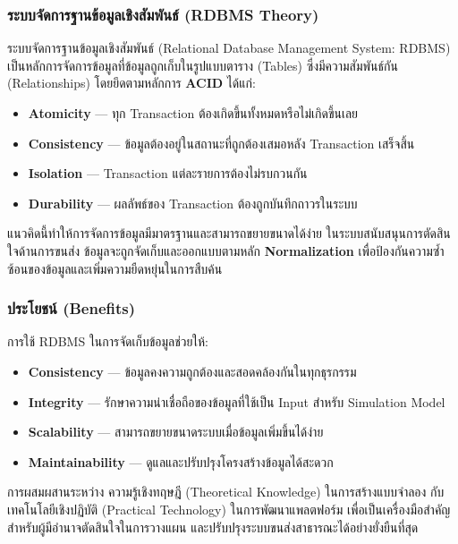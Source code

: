 \subsubsection{ระบบจัดการฐานข้อมูลเชิงสัมพันธ์ (RDBMS Theory)}
\begin{mypara}
    \indent ระบบจัดการฐานข้อมูลเชิงสัมพันธ์ (Relational Database Management System: RDBMS) 
    เป็นหลักการจัดการข้อมูลที่ข้อมูลถูกเก็บในรูปแบบตาราง (Tables) 
    ซึ่งมีความสัมพันธ์กัน (Relationships) โดยยึดตามหลักการ \textbf{ACID} ได้แก่:
\end{mypara}
\begin{itemize}
    \item \textbf{Atomicity} — ทุก Transaction ต้องเกิดขึ้นทั้งหมดหรือไม่เกิดขึ้นเลย
    \item \textbf{Consistency} — ข้อมูลต้องอยู่ในสถานะที่ถูกต้องเสมอหลัง Transaction เสร็จสิ้น
    \item \textbf{Isolation} — Transaction แต่ละรายการต้องไม่รบกวนกัน
    \item \textbf{Durability} — ผลลัพธ์ของ Transaction ต้องถูกบันทึกถาวรในระบบ
\end{itemize}

แนวคิดนี้ทำให้การจัดการข้อมูลมีมาตรฐานและสามารถขยายขนาดได้ง่าย
ในระบบสนับสนุนการตัดสินใจด้านการขนส่ง
ข้อมูลจะถูกจัดเก็บและออกแบบตามหลัก \textbf{Normalization} 
เพื่อป้องกันความซ้ำซ้อนของข้อมูลและเพิ่มความยืดหยุ่นในการสืบค้น

\subsubsection{\textbf{ประโยชน์ (Benefits)}}
\begin{mypara}
    \indent การใช้ RDBMS ในการจัดเก็บข้อมูลช่วยให้:
\end{mypara}
\begin{itemize}
    \item \textbf{Consistency} — ข้อมูลคงความถูกต้องและสอดคล้องกันในทุกธุรกรรม
    \item \textbf{Integrity} — รักษาความน่าเชื่อถือของข้อมูลที่ใช้เป็น Input สำหรับ Simulation Model
    \item \textbf{Scalability} — สามารถขยายขนาดระบบเมื่อข้อมูลเพิ่มขึ้นได้ง่าย
    \item \textbf{Maintainability} — ดูแลและปรับปรุงโครงสร้างข้อมูลได้สะดวก
\end{itemize}

\begin{mypara}
    \indent การผสมผสานระหว่าง ความรู้เชิงทฤษฎี (Theoretical Knowledge) 
ในการสร้างแบบจำลอง กับ เทคโนโลยีเชิงปฏิบัติ (Practical Technology) 
ในการพัฒนาแพลตฟอร์ม เพื่อเป็นเครื่องมือสำคัญสำหรับผู้มีอำนาจตัดสินใจในการวางแผน
และปรับปรุงระบบขนส่งสาธารณะได้อย่างยั่งยืนที่สุด
\end{mypara}
